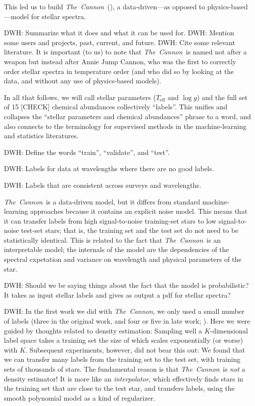 \documentclass[12pt,preprint]{aastex}
\newcommand{\project}[1]{\textsl{#1}}
\newcommand{\thecannon}{\project{The~Cannon}}
\newcommand{\logg}{\log g}
\newcommand{\Teff}{T_{\mathrm{eff}}}
\begin{document}
This led us to build \thecannon\ (\citealt{tc}), a data-driven---as
opposed to physics-based---model for stellar spectra.

DWH: Summarize what it does and what it can be used for.
DWH: Mention some users and projects, past, current, and future.
DWH: Cite some relevant literature.
It is important (to us) to note that \thecannon\ is named not after a
weapon but instead after Annie Jump Cannon, who was the first to
correctly order stellar spectra in temperature order (and who did so
by looking at the data, and without any use of physics-based models).

In all that follows, we will call stellar parameters ($\Teff$ and
$\logg$) and the full set of 15 [CHECK] chemical abundances
collectively ``labels''.
This unifies and collapses the ``stellar parameters and chemical
abundances'' phrase to a word, and also connects to the terminology
for supervised methods in the machine-learning and statistics
literatures.

DWH: Define the words ``train'', ``validate'', and ``test''.

DWH: Labels for data at wavelengths where there are no good labels.

DWH: Labels that are consistent across surveys and wavelengths.

\thecannon\ is a data-driven model, but it differs from standard machine-learning
approaches because it contains an explicit noise model.
This means that it can transfer labels from high signal-to-noise training-set
stars to low signal-to-noise test-set stars; that is, the training set and 
the test set do not need to be statistically identical.
This is related to the fact that \thecannon\ is an interpretable model;
the internals of the model are the dependencies of the spectral expetation
and variance on wavelength and physical parameters of the star.

DWH: Should we be saying things about the fact that the model is probabilistic?
It takes as input stellar labels and gives as output a pdf for stellar spectra?

DWH: In the first work we did with \thecannon, we only used a small
number of labels (three in the original work, and four or five in late
work; \citealt{tc, age}).
Here we were guided by thoughts related to density estimation:
Sampling well a $K$-dimensional label space takes a training set the
size of which scales exponentially (or worse) with $K$.
Subsequent experiments, however, did not bear this out:
We found that we can transfer many labels from the training set to
the test set, with training sets of thousands of stars.
The fundamental reason is that \thecannon\ is \emph{not} a density estimator!
It is more like an \emph{interpolator}, which effectively finds stars in
the training set that are close to the test star, and transfers labels,
using the smooth polynomial model as a kind of regularizer.
\end{document}
